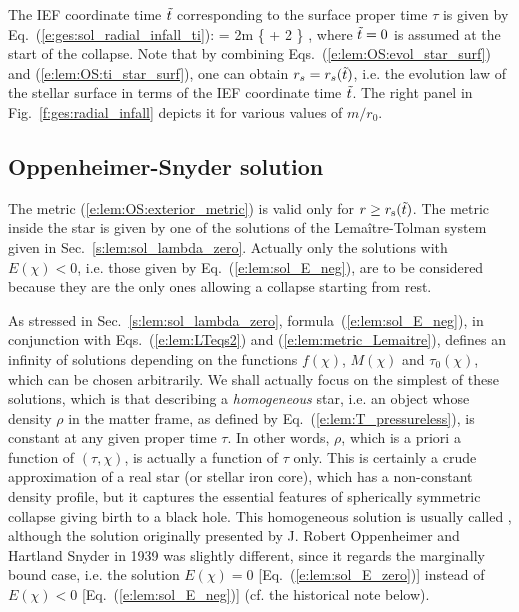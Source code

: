 The IEF coordinate time ${\tilde t}$ corresponding to the surface proper time $\tau$
is given by Eq.~(\ref{e:ges:sol_radial_infall_ti}):
\be \label{e:lem:OS:ti_star_surf}
     \ti = 2m \left\{  
    +  2 \ln {} \right\}  ,
\ee
where ${\tilde t} = 0$ is assumed at the start of the collapse.
Note that by combining Eqs.~(\ref{e:lem:OS:evol_star_surf}) and (\ref{e:lem:OS:ti_star_surf}),
one can obtain $r_s = r_s({\tilde t})$, i.e. the evolution law of the stellar surface
in terms of the IEF coordinate time ${\tilde t}$.
The right panel in Fig.~\ref{f:ges:radial_infall}
depicts it for various values of $m/r_0$.


\subsection{Oppenheimer-Snyder solution}

The metric (\ref{e:lem:OS:exterior_metric}) is valid only for $r \geq r_{\rm s}({\tilde t})$.
The metric inside the star is given by one of the solutions
of the Lemaître-Tolman system given in Sec.~\ref{s:lem:sol_lambda_zero}.
Actually only the solutions with $E(\chi)<0$, i.e. those given by Eq.~(\ref{e:lem:sol_E_neg}),
are to be considered because they are the only ones allowing a collapse starting
from rest.

As stressed in Sec.~\ref{s:lem:sol_lambda_zero}, formula~(\ref{e:lem:sol_E_neg}),
in conjunction with Eqs.~(\ref{e:lem:LTeqs2}) and
(\ref{e:lem:metric_Lemaitre}),
defines an infinity of solutions depending on the functions
$f(\chi)$, $M(\chi)$ and $\tau_0(\chi)$, which can be chosen arbitrarily.
We shall actually focus on the simplest of these solutions, which is that
describing a \emph{homogeneous} star, i.e. an object whose density
$\rho$ in the matter frame, as defined by Eq.~(\ref{e:lem:T_pressureless}),
is constant at any given proper time $\tau$. In other words, $\rho$, which
is a priori a function of $(\tau,\chi)$, is actually a function of $\tau$ only.
This is certainly a crude approximation of a real star (or stellar iron core),
which has a non-constant density profile, but it captures the essential
features of spherically symmetric collapse giving birth to a black hole.
This homogeneous solution is usually called
,
although the solution originally presented by J. Robert Oppenheimer
and Hartland Snyder in 1939 \cite{OppenS1939} was slightly
different, since it regards the marginally bound case, i.e. the solution $E(\chi) = 0$
[Eq.~(\ref{e:lem:sol_E_zero})] instead of $E(\chi)<0$ [Eq.~(\ref{e:lem:sol_E_neg})]
(cf. the historical note below).


